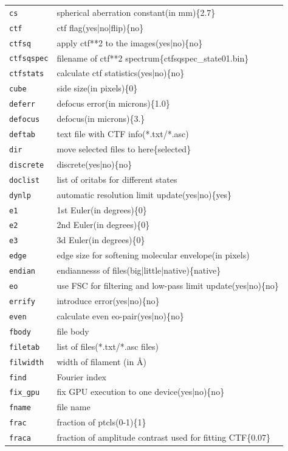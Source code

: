 \documentclass[a4paper,11pt]{article}
\begin{document}
\begin{tabular}{ll}
\texttt{cs}&{spherical aberration constant(in mm)\{2.7\}}\\
\texttt{ctf}&{ctf flag(yes|no|flip)\{no\}}\\
\texttt{ctfsq}&{apply ctf**2 to the images(yes|no)\{no\}}\\
\texttt{ctfsqspec}&{filename of ctf**2 spectrum\{ctfsqspec\_state01.bin\}}\\
\texttt{ctfstats}&{calculate ctf statistics(yes|no)\{no\}}\\
\texttt{cube}&{side size(in pixels)\{0\}}\\
\texttt{deferr}&{defocus error(in microns)\{1.0\}}\\
\texttt{defocus}&{defocus(in microns)\{3.\}}\\
\texttt{deftab}&{text file with CTF info(*.txt/*.asc)}\\
\texttt{dir}&{move selected files to here\{selected\}}\\
\texttt{discrete}&{discrete(yes|no)\{no\}}\\
\texttt{doclist}&{list of oritabs for different states}\\
\texttt{dynlp}&{automatic resolution limit update(yes|no)\{yes\}}\\
\texttt{e1}&{1st Euler(in degrees)\{0\}}\\
\texttt{e2}&{2nd Euler(in degrees)\{0\}}\\
\texttt{e3}&{3d Euler(in degrees)\{0\}}\\
\texttt{edge}&{edge size for softening molecular envelope(in pixels)}\\
\texttt{endian}&{endiannesss of files(big|little|native)\{native\}}\\
\texttt{eo}&{use FSC for filtering and low-pass limit update(yes|no)\{no\}}\\
\texttt{errify}&{introduce error(yes|no)\{no\}}\\
\texttt{even}&{calculate even eo-pair(yes|no)\{no\}}\\
\texttt{fbody}&{file body}\\
\texttt{filetab}&{list of files(*.txt/*.asc files)}\\
\texttt{filwidth}&{width of filament (in \AA{})}\\
\texttt{find}&{Fourier index}\\
\texttt{fix\_gpu}&{fix GPU execution to one device(yes|no)\{no\}}\\
\texttt{fname}&{file name}\\
\texttt{frac}&{fraction of ptcls(0-1)\{1\}}\\
\texttt{fraca}&{fraction of amplitude contrast used for fitting CTF\{0.07\}}\\
\end{tabular}
\end{document}

